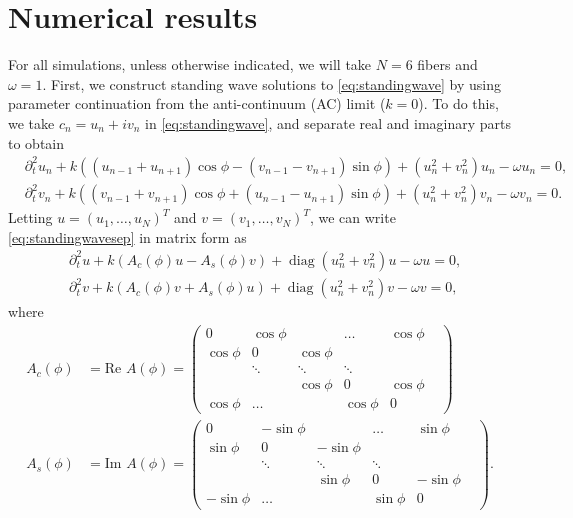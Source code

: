 \documentclass[11pt,reqno]{amsart}
\DeclareMathOperator{\diag}{diag}
\begin{document}
\section{Numerical results}\label{sec:numerics}

For all simulations, unless otherwise indicated, we will take $N=6$ fibers and $\omega=1$. First, we construct standing wave solutions to \cref{eq:standingwave} by using parameter continuation from the anti-continuum (AC) limit ($k=0$). To do this, we take $c_n = u_n + i v_n$ in \cref{eq:standingwave}, and separate real and imaginary parts to obtain
\begin{equation}\label{eq:standingwavesep}
\begin{aligned}
&\partial_t^2 u_n + k\left( (u_{n-1} + u_{n+1}) \cos \phi  - (v_{n-1} - v_{n+1})\sin \phi \right) + (u_n^2+v_n^2) u_n - \omega u_n= 0, \\
&\partial_t^2 v_n + k\left( (v_{n-1} + v_{n+1} ) \cos \phi + (u_{n-1}- u_{n+1})\sin \phi \right) +(u_n^2+v_n^2) v_n - \omega v_n = 0.
\end{aligned}
\end{equation}
Letting $u = (u_1, \dots, u_N)^T$ and $v = (v_1, \dots, v_N)^T$, we can write \cref{eq:standingwavesep} in matrix form as 
\begin{equation}\label{eq:standingwavematrixsep}
\begin{aligned}
&\partial_t^2 u + k (A_c(\phi) u - A_s(\phi) v) + \diag\left(u_n^2 + v_n^2 \right)u - \omega u = 0, \\
&\partial_t^2 v + k (A_c(\phi) v + A_s(\phi) u) + \diag\left(u_n^2 + v_n^2 \right)v - \omega v = 0,
\end{aligned}
\end{equation}
where
\begin{align*}
A_c(\phi) &= \text{Re } A(\phi) = \begin{pmatrix}
0 & \cos \phi & & \dots & \cos \phi \\
\cos \phi & 0 & \cos \phi & & & \\
& \ddots & \ddots & \ddots &  & \\
 & &\cos \phi  & 0 & \cos \phi  \\
\cos \phi& \dots & & \cos \phi & 0
\end{pmatrix} \\
A_s(\phi) &= \text{Im } A(\phi) = \begin{pmatrix}
0 & -\sin \phi & & \dots & \sin \phi \\
\sin \phi & 0 & -\sin \phi & & & \\
& \ddots & \ddots & \ddots &  & \\
 & &\sin \phi  & 0 & -\sin \phi  \\
-\sin \phi& \dots & & \sin \phi & 0
\end{pmatrix}.
\end{align*}
\end{document}
